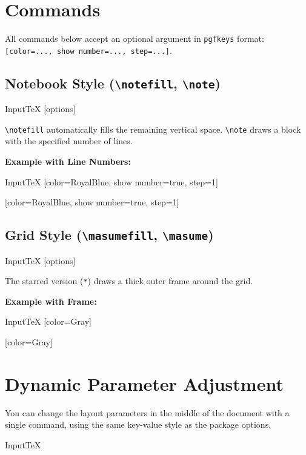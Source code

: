 \documentclass[luatex,fontsize=8pt,paper=b5,twoside]{jlreq}%
\begin{document}
\section{Commands}
All commands below accept an optional argument in \texttt{pgfkeys} format:
\texttt{[color=..., show number=..., step=...]}.

\subsection{Notebook Style (\texttt{\textbackslash notefill}, \texttt{\textbackslash note})}
\begin{SourceCode}{Input}{TeX}
  \notefill[options]
  [options]
\end{SourceCode}

\texttt{\textbackslash notefill} automatically fills the remaining vertical space. \texttt{\textbackslash note} draws a block with the specified number of lines.

\bigskip
\textbf{Example with Line Numbers:}
\begin{SourceCode}{Input}{TeX}
  [color=RoyalBlue, show number=true, step=1]
\end{SourceCode}
[color=RoyalBlue, show number=true, step=1]

\subsection{Grid Style (\texttt{\textbackslash masumefill}, \texttt{\textbackslash masume})}
\begin{SourceCode}{Input}{TeX}
  \masumefill*[options]
  [options]
\end{SourceCode}

The starred version (\texttt{*}) draws a thick outer frame around the grid.

\bigskip
\textbf{Example with Frame:}
\begin{SourceCode}{Input}{TeX}
  [color=Gray]
\end{SourceCode}
[color=Gray]

\section{Dynamic Parameter Adjustment}\label{sec:setkeisennote}
You can change the layout parameters in the middle of the document with a single
command, using the same key-value style as the package options.

\begin{SourceCode}{Input}{TeX}
  \SetKeisenNote[<key>=<value>, ...]
\end{SourceCode}
\end{document}

